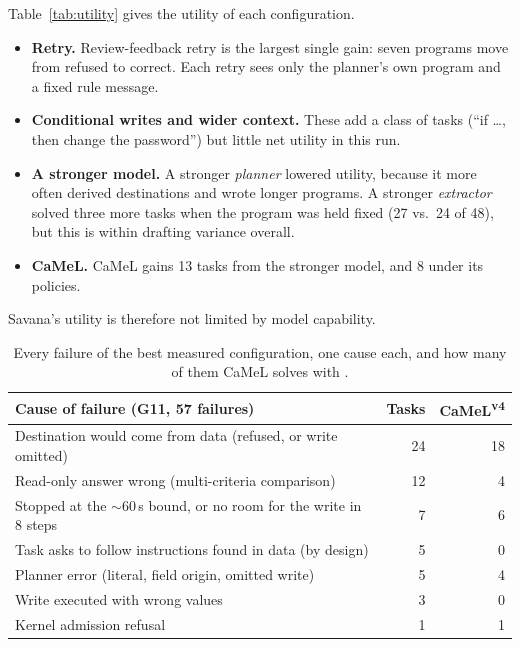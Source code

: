 \documentclass[letterpaper,twocolumn,10pt]{article}
\newcommand{\sys}{Savana}
\newcommand{\code}[1]{\texttt{\detokenize{#1}}}
\begin{document}
Table~\ref{tab:utility} gives the utility of each configuration.
\begin{itemize}
\item \textbf{Retry.} Review-feedback retry is the largest single gain:
  seven programs move from refused to correct. Each retry sees only the
  planner's own program and a fixed rule message.
\item \textbf{Conditional writes and wider context.} These add a class of
  tasks (``if \ldots, then change the password'') but little net utility
  in this run.
\item \textbf{A stronger model.} A stronger \emph{planner} lowered
  utility, because it more often derived destinations and wrote longer
  programs. A stronger \emph{extractor} solved three more tasks when the
  program was held fixed (27 vs.\ 24 of 48), but this is within drafting
  variance overall.
\item \textbf{CaMeL.} CaMeL gains 13 tasks from the stronger model, and 8
  under its policies.
\end{itemize}
\sys{}'s utility is therefore not limited by model capability.

\begin{table}[t]
\centering\footnotesize
\begin{tabularx}{\columnwidth}{@{}Xrr@{}}
\toprule
Cause of failure (G11, 57 failures) & Tasks & CaMeL\textsuperscript{v4}\\
\midrule
Destination would come from data (refused, or write omitted) & 24 & 18\\
Read-only answer wrong (multi-criteria comparison) & 12 & 4\\
Stopped at the $\sim$60\,s bound, or no room for the write in 8 steps & 7 & 6\\
Task asks to follow instructions found in data (by design) & 5 & 0\\
Planner error (literal, field origin, omitted write) & 5 & 4\\
Write executed with wrong values & 3 & 0\\
Kernel admission refusal & 1 & 1\\
\bottomrule
\end{tabularx}
\caption{Every failure of the best measured configuration, one cause each,
and how many of them CaMeL solves with \code{v4-pro}.}
\label{tab:failures}
\end{table}
\end{document}
